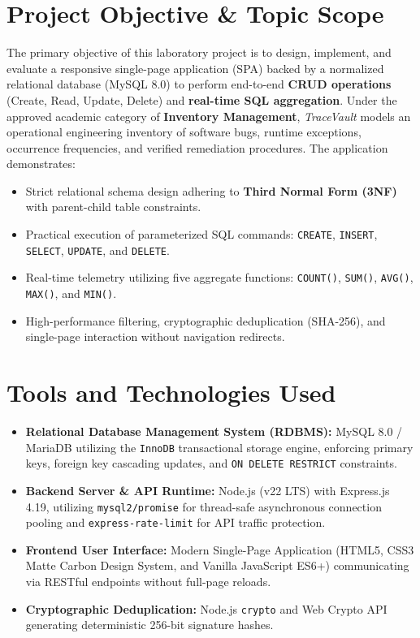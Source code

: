 \documentclass[10pt,a4paper]{article}
\begin{document}
\section{Project Objective \& Topic Scope}
The primary objective of this laboratory project is to design, implement, and evaluate a responsive single-page application (SPA) backed by a normalized relational database (MySQL 8.0) to perform end-to-end \textbf{CRUD operations} (Create, Read, Update, Delete) and \textbf{real-time SQL aggregation}. Under the approved academic category of \textbf{Inventory Management}, \textit{TraceVault} models an operational engineering inventory of software bugs, runtime exceptions, occurrence frequencies, and verified remediation procedures. The application demonstrates:
\begin{itemize}\setlength\itemsep{-2pt}
  \item Strict relational schema design adhering to \textbf{Third Normal Form (3NF)} with parent-child table constraints.
  \item Practical execution of parameterized SQL commands: \texttt{CREATE}, \texttt{INSERT}, \texttt{SELECT}, \texttt{UPDATE}, and \texttt{DELETE}.
  \item Real-time telemetry utilizing five aggregate functions: \texttt{COUNT()}, \texttt{SUM()}, \texttt{AVG()}, \texttt{MAX()}, and \texttt{MIN()}.
  \item High-performance filtering, cryptographic deduplication (SHA-256), and single-page interaction without navigation redirects.
\end{itemize}

\section{Tools and Technologies Used}
\begin{itemize}\setlength\itemsep{-2pt}
  \item \textbf{Relational Database Management System (RDBMS):} MySQL 8.0 / MariaDB utilizing the \texttt{InnoDB} transactional storage engine, enforcing primary keys, foreign key cascading updates, and \texttt{ON DELETE RESTRICT} constraints.
  \item \textbf{Backend Server \& API Runtime:} Node.js (v22 LTS) with Express.js 4.19, utilizing \texttt{mysql2/promise} for thread-safe asynchronous connection pooling and \texttt{express-rate-limit} for API traffic protection.
  \item \textbf{Frontend User Interface:} Modern Single-Page Application (HTML5, CSS3 Matte Carbon Design System, and Vanilla JavaScript ES6+) communicating via RESTful endpoints without full-page reloads.
  \item \textbf{Cryptographic Deduplication:} Node.js \texttt{crypto} and Web Crypto API generating deterministic 256-bit signature hashes.
\end{itemize}
\end{document}
